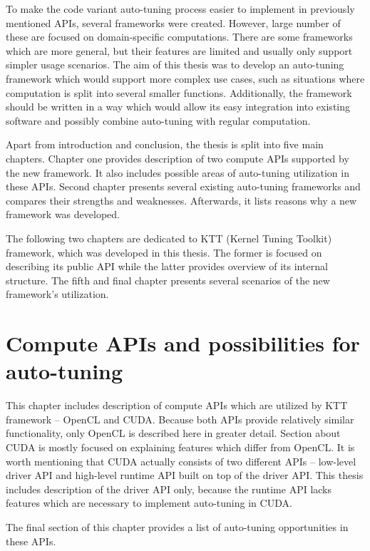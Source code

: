 \documentclass
[
    digital, %
    oneside, %
    table, %
    nolof, %
    nolot, %
    nocover %
]{fithesis3}
\begin{document}
To make the code variant auto-tuning process easier to implement in previously mentioned APIs, several frameworks were created. However, large number of
these are focused on domain-specific computations. There are some frameworks which are more general, but their features are limited and usually only
support simpler usage scenarios. The aim of this thesis was to develop an auto-tuning framework which would support more complex use cases, such as
situations where computation is split into several smaller functions. Additionally, the framework should be written in a way which would allow its easy
integration into existing software and possibly combine auto-tuning with regular computation.

Apart from introduction and conclusion, the thesis is split into five main chapters. Chapter one provides description of two compute APIs supported
by the new framework. It also includes possible areas of auto-tuning utilization in these APIs. Second chapter presents several existing auto-tuning
frameworks and compares their strengths and weaknesses. Afterwards, it lists reasons why a new framework was developed.

The following two chapters are dedicated to KTT (Kernel Tuning Toolkit) framework, which was developed in this thesis. The former is focused on
describing its public API while the latter provides overview of its internal structure. The fifth and final chapter presents several scenarios of the
new framework's utilization.

\chapter{Compute APIs and possibilities for auto-tuning}
This chapter includes description of compute APIs which are utilized by KTT framework -- OpenCL and CUDA. Because both APIs provide relatively similar
functionality, only OpenCL is described here in greater detail. Section about CUDA is mostly focused on explaining features which differ from OpenCL.
It is worth mentioning that CUDA actually consists of two different APIs -- low-level driver API and high-level runtime API built on top of the driver
API. This thesis includes description of the driver API only, because the runtime API lacks features which are necessary to implement auto-tuning in CUDA.

The final section of this chapter provides a list of auto-tuning opportunities in these APIs.
\end{document}
